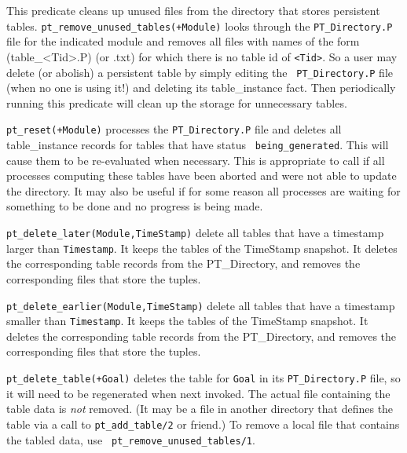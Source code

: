 \begin{description}
%
This predicate cleans up unused files from the directory that stores
persistent tables. {\tt pt\_remove\_unused\_tables(+Module)} looks
through the {\tt PT\_Directory.P} file for the indicated module and
removes all files with names of the form \file(table\_<Tid>.P) (or
.txt) for which there is no table id of {\tt <Tid>}.  So a user may
delete (or abolish) a persistent table by simply editing the {\tt
  PT\_Directory.P} file (when no one is using it!) and deleting its
table\_instance fact.  Then periodically running this predicate will
clean up the storage for unnecessary tables.

%
{\tt pt\_reset(+Module)} processes the {\tt PT\_Directory.P} file and
deletes all table\_instance records for tables that have status {\tt
  being\_generated}.  This will cause them to be re-evaluated when
necessary.  This is appropriate to call if all processes computing
these tables have been aborted and were not able to update the
directory.  It may also be useful if for some reason all processes are
waiting for something to be done and no progress is being made.

%
{\tt pt\_delete\_later(Module,TimeStamp)} delete all tables that have a
timestamp larger than {\tt Timestamp}.  It keeps the tables of the
TimeStamp snapshot.  It deletes the corresponding table records from
the PT\_Directory, and removes the corresponding files that store the tuples.  

%
{\tt pt\_delete\_earlier(Module,TimeStamp)} delete all tables that have a
timestamp smaller than {\tt Timestamp}.  It keeps the tables of the
TimeStamp snapshot.  It deletes the corresponding table records from
the PT\_Directory, and removes the corresponding files that store the tuples. 

%
{\tt pt\_delete\_table(+Goal)} deletes the table for {\tt Goal} in its
{\tt PT\_Directory.P} file, so it will need to be regenerated when next
invoked.  The actual file containing the table data is {\em not}
removed.  (It may be a file in another directory that defines the
table via a call to {\tt pt\_add\_table/2} or friend.)  To remove a
local file that contains the tabled data, use {\tt
  pt\_remove\_unused\_tables/1}.


\end{description}
